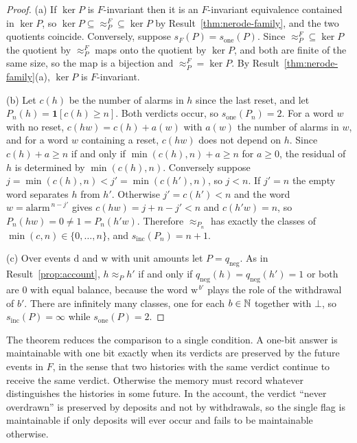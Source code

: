 \begin{proof}
(a) If $\ker P$ is $F$-invariant then it is an $F$-invariant equivalence contained in $\ker P$, so ${\ker P}\subseteq{\approx^{F}_P}\subseteq{\ker P}$ by Result~\ref{thm:nerode-family}, and the two quotients coincide. Conversely, suppose $s_F(P)=s_{\mathrm{one}}(P)$. Since ${\approx^{F}_P}\subseteq\ker P$ the quotient by $\approx^{F}_P$ maps onto the quotient by $\ker P$, and both are finite of the same size, so the map is a bijection and ${\approx^{F}_P}=\ker P$. By Result~\ref{thm:nerode-family}(a), $\ker P$ is $F$-invariant.

(b) Let $c(h)$ be the number of alarms in $h$ since the last reset, and let $P_n(h)=\mathbf 1[c(h)\ge n]$. Both verdicts occur, so $s_{\mathrm{one}}(P_n)=2$. For a word $w$ with no reset, $c(hw)=c(h)+a(w)$ with $a(w)$ the number of alarms in $w$, and for a word $w$ containing a reset, $c(hw)$ does not depend on $h$. Since $c(h)+a\ge n$ if and only if $\min(c(h),n)+a\ge n$ for $a\ge0$, the residual of $h$ is determined by $\min(c(h),n)$. Conversely suppose $j=\min(c(h),n)<j'=\min(c(h'),n)$, so $j<n$. If $j'=n$ the empty word separates $h$ from $h'$. Otherwise $j'=c(h')<n$ and the word $w=\mathrm{alarm}^{\,n-j'}$ gives $c(hw)=j+n-j'<n$ and $c(h'w)=n$, so $P_n(hw)=0\ne1=P_n(h'w)$. Therefore $\approx_{P_n}$ has exactly the classes of $\min(c,n)\in\{0,\dots,n\}$, and $s_{\mathrm{inc}}(P_n)=n+1$.

(c) Over events $\mathrm d$ and $\mathrm w$ with unit amounts let $P=q_{\mathrm{neg}}$. As in Result~\ref{prop:account}, $h\approx_Ph'$ if and only if $q_{\mathrm{neg}}(h)=q_{\mathrm{neg}}(h')=1$ or both are $0$ with equal balance, because the word $\mathrm w^{\,b'}$ plays the role of the withdrawal of $b'$. There are infinitely many classes, one for each $b\in\mathbb{N}$ together with $\bot$, so $s_{\mathrm{inc}}(P)=\infty$ while $s_{\mathrm{one}}(P)=2$.
\end{proof}

The theorem reduces the comparison to a single condition. A one-bit answer is maintainable with one bit exactly when its verdicts are preserved by the future events in $F$, in the sense that two histories with the same verdict continue to receive the same verdict. Otherwise the memory must record whatever distinguishes the histories in some future. In the account, the verdict ``never overdrawn'' is preserved by deposits and not by withdrawals, so the single flag is maintainable if only deposits will ever occur and fails to be maintainable otherwise.

